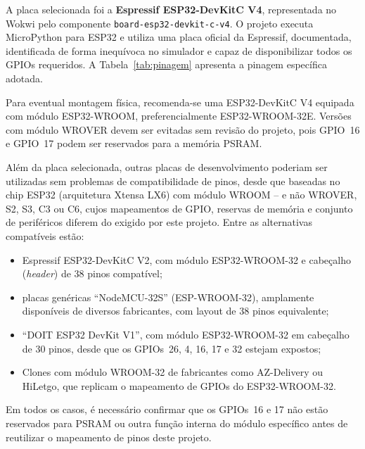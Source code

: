 \documentclass[12pt,a4paper]{article}
\begin{document}
A placa selecionada foi a \textbf{Espressif ESP32-DevKitC V4}, representada no Wokwi pelo componente \texttt{board-esp32-devkit-c-v4}. O projeto executa MicroPython para ESP32 e utiliza uma placa oficial da Espressif, documentada, identificada de forma inequívoca no simulador e capaz de disponibilizar todos os GPIOs requeridos. A Tabela~\ref{tab:pinagem} apresenta a pinagem específica adotada.

Para eventual montagem física, recomenda-se uma ESP32-DevKitC V4 equipada com módulo ESP32-WROOM, preferencialmente ESP32-WROOM-32E. Versões com módulo WROVER devem ser evitadas sem revisão do projeto, pois GPIO~16 e GPIO~17 podem ser reservados para a memória PSRAM.

Além da placa selecionada, outras placas de desenvolvimento poderiam ser utilizadas sem problemas de compatibilidade de pinos, desde que baseadas no chip ESP32 (arquitetura Xtensa LX6) com módulo WROOM -- e não WROVER, S2, S3, C3 ou C6, cujos mapeamentos de GPIO, reservas de memória e conjunto de periféricos diferem do exigido por este projeto. Entre as alternativas compatíveis estão:

\begin{itemize}
  \item Espressif ESP32-DevKitC V2, com módulo ESP32-WROOM-32 e cabeçalho (\textit{header}) de 38 pinos compatível;
  \item placas genéricas \enquote{NodeMCU-32S} (ESP-WROOM-32), amplamente disponíveis de diversos fabricantes, com layout de 38 pinos equivalente;
  \item \enquote{DOIT ESP32 DevKit V1}, com módulo ESP32-WROOM-32 em cabeçalho de 30 pinos, desde que os GPIOs~26, 4, 16, 17 e 32 estejam expostos;
  \item Clones com módulo WROOM-32 de fabricantes como AZ-Delivery ou HiLetgo, que replicam o mapeamento de GPIOs do ESP32-WROOM-32.
\end{itemize}

Em todos os casos, é necessário confirmar que os GPIOs~16 e 17 não estão reservados para PSRAM ou outra função interna do módulo específico antes de reutilizar o mapeamento de pinos deste projeto.
\end{document}
